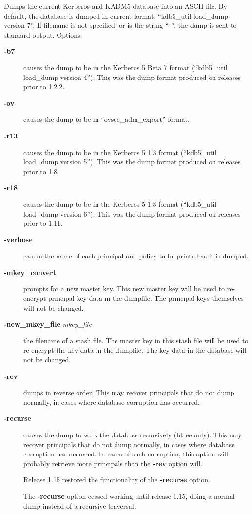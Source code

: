 \documentclass[letterpaper,10pt,english]{sphinxmanual}
\begin{document}
Dumps the current Kerberos and KADM5 database into an ASCII file.  By
default, the database is dumped in current format, ``kdb5\_util
load\_dump version 7''.  If filename is not specified, or is the string
``-'', the dump is sent to standard output.  Options:
\begin{description}
\item[{\textbf{-b7}}] \leavevmode
causes the dump to be in the Kerberos 5 Beta 7 format (``kdb5\_util
load\_dump version 4'').  This was the dump format produced on
releases prior to 1.2.2.

\item[{\textbf{-ov}}] \leavevmode
causes the dump to be in ``ovsec\_adm\_export'' format.

\item[{\textbf{-r13}}] \leavevmode
causes the dump to be in the Kerberos 5 1.3 format (``kdb5\_util
load\_dump version 5'').  This was the dump format produced on
releases prior to 1.8.

\item[{\textbf{-r18}}] \leavevmode
causes the dump to be in the Kerberos 5 1.8 format (``kdb5\_util
load\_dump version 6'').  This was the dump format produced on
releases prior to 1.11.

\item[{\textbf{-verbose}}] \leavevmode
causes the name of each principal and policy to be printed as it
is dumped.

\item[{\textbf{-mkey\_convert}}] \leavevmode
prompts for a new master key.  This new master key will be used to
re-encrypt principal key data in the dumpfile.  The principal keys
themselves will not be changed.

\item[{\textbf{-new\_mkey\_file} \emph{mkey\_file}}] \leavevmode
the filename of a stash file.  The master key in this stash file
will be used to re-encrypt the key data in the dumpfile.  The key
data in the database will not be changed.

\item[{\textbf{-rev}}] \leavevmode
dumps in reverse order.  This may recover principals that do not
dump normally, in cases where database corruption has occurred.

\item[{\textbf{-recurse}}] \leavevmode
causes the dump to walk the database recursively (btree only).
This may recover principals that do not dump normally, in cases
where database corruption has occurred.  In cases of such
corruption, this option will probably retrieve more principals
than the \textbf{-rev} option will.

Release 1.15 restored the functionality of the \textbf{-recurse}
option.

The \textbf{-recurse} option ceased working until release 1.15,
doing a normal dump instead of a recursive traversal.

\end{description}
\end{document}
